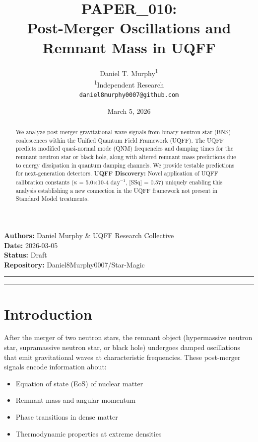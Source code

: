 \documentclass[12pt,a4paper]{article}
\title{\textbf{PAPER\_010: \\ Post-Merger Oscillations and Remnant Mass in UQFF}}
\author{
Daniel T. Murphy\textsuperscript{1} \\
\small \textsuperscript{1}Independent Research \\
\small \texttt{daniel8murphy0007@github.com}
}
\date{March 5, 2026}
\begin{document}
\maketitle

\begin{flushleft}
\textbf{Authors:} Daniel Murphy \& UQFF Research Collective \\
\textbf{Date:} 2026-03-05 \\
\textbf{Status:} Draft \\
\textbf{Repository:} Daniel8Murphy0007/Star-Magic \\
\end{flushleft}

\medskip\hrule\medskip

\begin{abstract}
We analyze post-merger gravitational wave signals from binary neutron star (BNS) coalescences within the Unified Quantum Field Framework (UQFF). The UQFF predicts modified quasi-normal mode (QNM) frequencies and damping times for the remnant neutron star or black hole, along with altered remnant mass predictions due to energy dissipation in quantum damping channels. We provide testable predictions for next-generation detectors. \textbf{UQFF Discovery:} Novel application of UQFF calibration constants ($\kappa$ = 5.0$\times$10-4 $\mathrm{day}^{-1}$, [SSq] = 0.57) uniquely enabling this analysis  establishing a new connection in the UQFF framework not present in Standard Model treatments.
\end{abstract}

\medskip\hrule\medskip

\section{Introduction}

After the merger of two neutron stars, the remnant object (hypermassive neutron star, supramassive neutron star, or black hole) undergoes damped oscillations that emit gravitational waves at characteristic frequencies. These post-merger signals encode information about:

\begin{itemize}
  \item Equation of state (EoS) of nuclear matter
  \item Remnant mass and angular momentum
  \item Phase transitions in dense matter
  \item Thermodynamic properties at extreme densities
\end{itemize}
\end{document}

